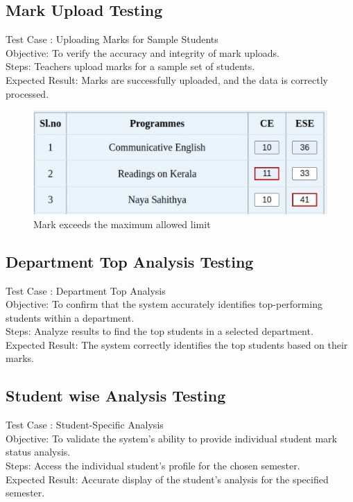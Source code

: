 \documentclass{nascproject}
\begin{document}
\subsection{Mark Upload Testing}
Test Case : Uploading Marks for Sample Students\\
Objective: To verify the accuracy and integrity of mark uploads.\\
Steps: Teachers upload marks for a sample set of students.\\
Expected Result: Marks are successfully uploaded, and the data is correctly processed.

\begin{figure}[H]
	\centering
	\includegraphics[scale=0.5]{testing.jpeg}
	\caption{Mark exceeds the maximum allowed limit}
	\label{testing}
\end{figure}
\subsection{Department Top Analysis Testing}
Test Case : Department Top Analysis\\
Objective: To confirm that the system accurately identifies top-performing students within a department.\\
Steps: Analyze results to find the top students in a selected department.\\
Expected Result: The system correctly identifies the top students based on their marks.
\subsection{ Student wise Analysis Testing}
Test Case : Student-Specific Analysis\\
Objective: To validate the system's ability to provide individual student mark status analysis.\\
Steps: Access the individual student's profile for the chosen semester.\\
Expected Result: Accurate display of the student's analysis for the specified semester.\\
\end{document}
